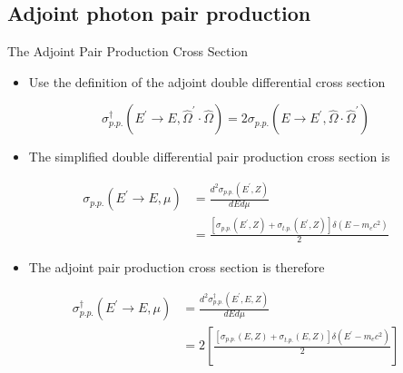 \documentclass{beamer}
\begin{document}
\subsection{Adjoint photon pair production}
\begin{frame}{The Adjoint Pair Production Cross Section}

  \begin{itemize}
    \item Use the definition of the adjoint double differential cross section
  \end{itemize}
  
  \begin{equation*}
    \sigma_{p.p.}^{\dagger}(E^{'} \to E, \hat{\Omega}^{'} \cdot \hat{\Omega}) =
    2\sigma_{p.p.}(E \to E^{'},\hat{\Omega} \cdot \hat{\Omega}^{'})
  \end{equation*}

  \bigskip

  \begin{itemize}
    \item The simplified double differential pair production cross section is
  \end{itemize}
  \begin{align}
    \sigma_{p.p.}(E^{'} \to E,\mu) & = \frac{d^2\sigma_{p.p.}(E^{'},Z)}{dEd\mu} 
    \nonumber \\
    & = \frac{[\sigma_{p.p.}(E^{'},Z) + \sigma_{t.p.}(E^{'},Z)] 
      \delta(E - m_ec^2)}{2} \nonumber
  \end{align}

  

  \begin{itemize}
    \item The adjoint pair production cross section is therefore
  \end{itemize}
  \begin{align}
    \sigma_{p.p.}^{\dagger}(E^{'} \to E,\mu) & = 
    \frac{d^2\sigma_{p.p.}^{\dagger}(E^{'},E,Z)}{dEd\mu} \nonumber \\
    & = 2\left[\frac{\left[\sigma_{p.p.}(E,Z)+\sigma_{t.p.}(E,Z)\right]
      \delta(E^{'}-m_ec^2)}{2}\right] \nonumber
  \end{align}
  
\end{frame}
\end{document}
